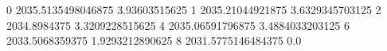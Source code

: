0 2035.5135498046875 3.93603515625
1 2035.21044921875 3.6329345703125
2 2034.8984375 3.3209228515625
4 2035.06591796875 3.4884033203125
6 2033.5068359375 1.9293212890625
8 2031.5775146484375 0.0
